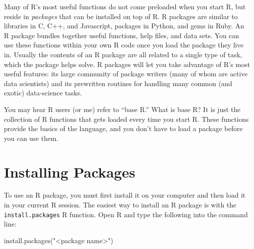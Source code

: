 \documentclass[
  letterpaper,
  DIV=11,
  numbers=noendperiod]{scrbook}
\newenvironment{Shaded}{\begin{snugshade}}{\end{snugshade}}
\newcommand{\FunctionTok}[1]{\textcolor[rgb]{0.28,0.35,0.67}{#1}}
\newcommand{\NormalTok}[1]{\textcolor[rgb]{0.00,0.23,0.31}{#1}}
\newcommand{\StringTok}[1]{\textcolor[rgb]{0.13,0.47,0.30}{#1}}
\begin{document}
Many of R's most useful functions do not come preloaded when you start
R, but reside in \emph{packages} that can be installed on top of R. R
packages are similar to libraries in C, C++, and Javascript, packages in
Python, and gems in Ruby. An R package bundles together useful
functions, help files, and data sets. You can use these functions within
your own R code once you load the package they live in. Usually the
contents of an R package are all related to a single type of task, which
the package helps solve. R packages will let you take advantage of R's
most useful features: its large community of package writers (many of
whom are active data scientists) and its prewritten routines for
handling many common (and exotic) data-science tasks.

\begin{tcolorbox}[enhanced jigsaw, breakable, colback=white, colbacktitle=quarto-callout-tip-color!10!white, arc=.35mm, bottomrule=.15mm, coltitle=black, left=2mm, rightrule=.15mm, colframe=quarto-callout-tip-color-frame, leftrule=.75mm, opacitybacktitle=0.6, bottomtitle=1mm, toptitle=1mm, titlerule=0mm, opacityback=0, title=\textcolor{quarto-callout-tip-color}{\faLightbulb}\hspace{0.5em}{Base R}, toprule=.15mm]

You may hear R users (or me) refer to ``base R.'' What is base R? It is
just the collection of R functions that gets loaded every time you start
R. These functions provide the basics of the language, and you don't
have to load a package before you can use them.

\end{tcolorbox}

\section{Installing Packages}\label{installing-packages}

To use an R package, you must first install it on your computer and then
load it in your current R session. The easiest way to install an R
package is with the \texttt{install.packages} R function. Open R and
type the following into the command line:

\begin{Shaded}
\begin{Highlighting}[]
\FunctionTok{install.packages}\NormalTok{(}\StringTok{"\textless{}package name\textgreater{}"}\NormalTok{)}
\end{Highlighting}
\end{Shaded}
\end{document}
